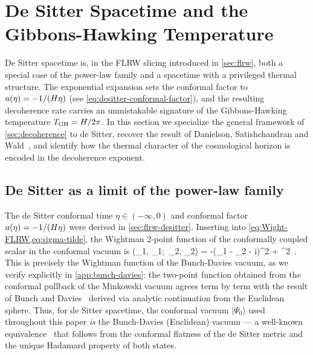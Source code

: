 
\section{De Sitter Spacetime and the Gibbons-Hawking Temperature}
\label{sec:desitter}

De Sitter spacetime is, in the FLRW slicing introduced in \cref{sec:flrw},
both a special case of the power-law family and a spacetime with a privileged
thermal structure.  The exponential expansion sets the conformal factor to
$a(\eta) = -1/(H\eta)$ (see \cref{eq:desitter-conformal-factor}), and
the resulting decoherence rate carries an unmistakable signature of the
Gibbons-Hawking temperature $T_{\rm GH} = H/2\pi$.  In this section we
specialize the general framework of \cref{sec:decoherence} to de Sitter,
recover the result of Danielson, Satishchandran and Wald~\cite{Danielson:2022tdw},
and identify how the thermal character of the cosmological horizon is encoded
in the decoherence exponent.

\subsection{De Sitter as a limit of the power-law family}
\label{sec:desitter-limit}

The de Sitter conformal time $\eta \in (-\infty, 0)$ and conformal factor
$a(\eta) = -1/(H\eta)$ were derived in \cref{sec:flrw-desitter}.
Inserting into \cref{eq:Wight-FLRW,eq:sigma-tilde}, the Wightman 2-point
function of the conformally coupled scalar in the conformal vacuum is
%
\be
  \Wight(\eta_1, _1;\, \eta_2, _2)
  =
  \cdot
       {-\lb(\eta_1 - \eta_2 - i\varepsilon\rb)^2
        + ^2} \,.
  \label{eq:Wight-dS}
\ee
%
This is precisely the Wightman function of the Bunch-Davies vacuum, as we
verify explicitly in \cref{app:bunch-davies}: the two-point function obtained
from the conformal pullback of the Minkowski vacuum agrees term by term with
the result of Bunch and Davies~\cite{BunchDavies1978,Allen1985} derived via
analytic continuation from the Euclidean sphere.  Thus, for de Sitter spacetime,
the conformal vacuum $|\Psi_0\rangle$ used throughout this paper \emph{is} the
Bunch-Davies (Euclidean) vacuum — a well-known equivalence~\cite{BunchDavies1978,Allen1985}
that follows from the conformal flatness of the de Sitter metric and the unique
Hadamard property of both states.

